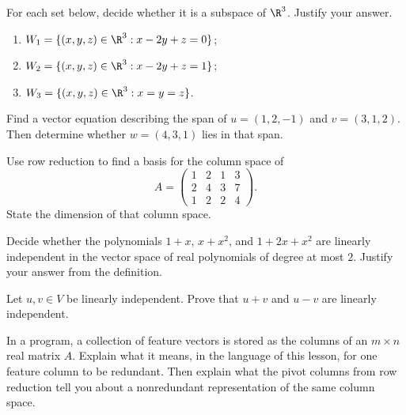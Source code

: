 
\begin{exercise}\label{ex:la-1}
For each set below, decide whether it is a subspace of $\R^3$. Justify your answer.
\begin{enumerate}[label=(\alph*)]
  \item $W_1=\{(x,y,z)\in\R^3:x-2y+z=0\}$;
  \item $W_2=\{(x,y,z)\in\R^3:x-2y+z=1\}$;
  \item $W_3=\{(x,y,z)\in\R^3:x=y=z\}$.
\end{enumerate}
\end{exercise}

\begin{exercise}\label{ex:la-2}
Find a vector equation describing the span of $u=(1,2,-1)$ and $v=(3,1,2)$. Then determine whether $w=(4,3,1)$ lies in that span.
\end{exercise}

\begin{exercise}\label{ex:la-3}
Use row reduction to find a basis for the column space of
\[
  A=\begin{pmatrix}1&2&1&3\\2&4&3&7\\1&2&2&4\end{pmatrix}.
\]
State the dimension of that column space.
\end{exercise}

\begin{exercise}\label{ex:la-4}
Decide whether the polynomials $1+x$, $x+x^2$, and $1+2x+x^2$ are linearly independent in the vector space of real polynomials of degree at most $2$. Justify your answer from the definition.
\end{exercise}

\begin{exercise}\label{ex:la-5}
Let $u,v\in V$ be linearly independent. Prove that $u+v$ and $u-v$ are linearly independent.
\end{exercise}

\begin{exercise}\label{ex:la-6}
In a program, a collection of feature vectors is stored as the columns of an $m\times n$ real matrix $A$. Explain what it means, in the language of this lesson, for one feature column to be redundant. Then explain what the pivot columns from row reduction tell you about a nonredundant representation of the same column space.
\end{exercise}
